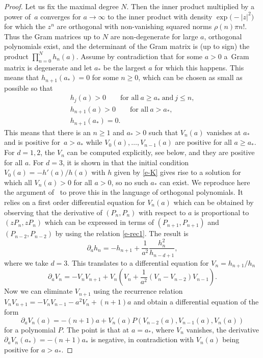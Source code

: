 \documentclass[pdftex]{sigma}
\numberwithin{equation}{section}
\theoremstyle{definition}
\begin{document}
\begin{proof} Let us fix the maximal degree $N$. Then the inner product multiplied by a power of~$a$ converges for $a\to\infty$ to the inner product with density $\exp\bigl(-|z|^2\bigr)$ for which the $z^n$ are orthogonal with non-vanishing squared norms $\rho(n)\pi n!$. Thus the Gram matrices up to $N$ are non-degenerate for large $a$, orthogonal polynomials exist, and the determinant of the Gram matrix is (up to sign) the product $\prod_{n=0}^Nh_n(a)$. Assume by contradiction that for some $a>0$ a~Gram matrix is degenerate and let $a_*$ be the largest $a$ for which this happens. This means that $h_{n+1}(a_*)=0$ for some $n\geq0$, which can be chosen as small as possible so that
\begin{gather*}
h_{j}(a)>0 \qquad\text{for all}\ a\geq a_* \ \text{and}\ j\leq n,
\\
h_{n+1}(a)>0\qquad \text{for all}\ a>a_*,
 \\
 h_{n+1}(a_*)=0.
\end{gather*}
This means that there is an $n\geq1$ and $a_*>0$ such that $V_n(a)$ vanishes at $a_*$ and is positive for~${a>a_*}$ while $V_0(a),\dots,V_{n-1}(a)$ are positive for all $a\geq a_*$. For $d=1,2$, the $V_n$ can be computed explicitly, see below, and they are positive for all $a$. For $d=3$, it is shown in \cite{CDHM2025,Hoppe2025} that the initial condition $V_0(a)=-h'(a)/h(a)$ with $h$ given by \eqref{e-K} gives rise to a solution for which all $V_n(a)>0$ for all $a>0$, so no such $a_*$ can exist.
We reproduce here the argument of~\cite{Hoppe2025} to prove this in the language of orthogonal polynomials. It relies on a first order differential equation for $V_n(a)$ which can be obtained by observing that the derivative of $(P_n,P_n)$ with respect to $a$ is proportional to $(zP_n,zP_n)$ which can be expressed in terms of $(P_{n+1},P_{n+1})$ and~${(P_{n-2},P_{n-2})}$ by using the relation \eqref{e-rec1}. The result is
\[
\partial_ah_n=-h_{n+1}+\frac1{a^2}\frac{h_n^2}{h_{n-d+1}},
\]
where we take $d=3$. This translates to a differential equation for $V_n=h_{n+1}/h_n$
\[
\partial_aV_n=-V_nV_{n+1} +V_n\left(V_n+\frac1{a^2}(V_n-V_{n-2})V_{n-1}\right).
\]
Now we can eliminate $V_{n+1}$ using the recurrence relation $V_nV_{n+1}=-V_nV_{n-1}-a^2V_n+(n+1)a$ and obtain a differential equation of the form
\[
\partial_aV_n(a)=-(n+1)a+V_n(a) P(V_{n-2}(a),V_{n-1}(a),V_n(a))
\]
for a polynomial $P$. The point is that at $a=a_*$, where $V_n$ vanishes, the derivative $\partial_aV_n(a_*)=-(n+1)a_*$ is negative, in contradiction with $V_n(a)$ being positive for $a>a_*$.
\end{proof}
\end{document}

